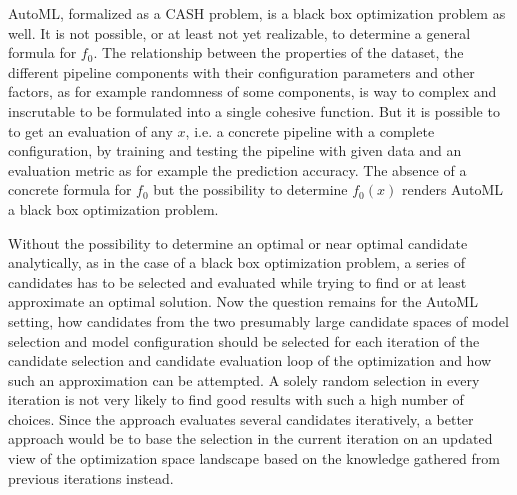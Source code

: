 AutoML, formalized as a CASH problem, is a black box optimization problem as well.
It is not possible, or at least not yet realizable, to determine a general formula for $f_0$.
The relationship between the properties of the dataset, the different pipeline components with their configuration parameters and other factors, as for example randomness of some components, is way to complex and inscrutable to be formulated into a single cohesive function.\newline
But it is possible to to get an evaluation of any $x$, i.e. a concrete pipeline with a complete configuration, by training and testing the pipeline with given data and an evaluation metric as for example the prediction accuracy.
The absence of a concrete formula for $f_0$ but the possibility to determine $f_0(x)$ renders AutoML a black box optimization problem.

Without the possibility to determine an optimal or near optimal candidate analytically, as in the case of a black box optimization problem, a series of candidates has to be selected and evaluated while trying to find or at least approximate an optimal solution.
Now the question remains for the AutoML setting, how candidates from the two presumably large candidate spaces of model selection and model configuration should be selected for each iteration of the candidate selection and candidate evaluation loop of the optimization and how such an approximation can be attempted.\newline
A solely random selection in every iteration is not very likely to find good results with such a high number of choices.
Since the approach evaluates several candidates iteratively, a better approach would be to base the selection in the current iteration on an updated view of the optimization space landscape based on the knowledge gathered from previous iterations instead.

